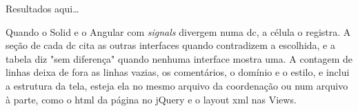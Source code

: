 Resultados aqui…

Quando o Solid e o Angular com \emph{signals} divergem numa \gls{dc}, a célula o
registra.
A seção de cada \gls{dc} cita as outras interfaces quando contradizem a escolhida, e a tabela
diz "sem diferença" quando nenhuma interface mostra uma.
A contagem de linhas deixa de fora as linhas vazias, os comentários, o
domínio e o estilo, e inclui a estrutura da tela, esteja ela no mesmo arquivo da
coordenação ou num arquivo à parte, como o \gls{html} da página no jQuery e o
layout \gls{xml} nas Views.
